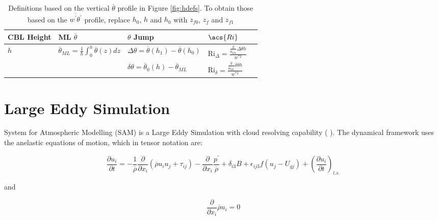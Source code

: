 \begin{table}[htbp]
\caption[Height definitions]{Definitions based on the vertical $\overline{\theta}$ profile in Figure \ref{fig:hdefs}.  To obtain those based on the $\overline{w^{'}\theta^{'}}$ profile, replace $h_{0}$, $h$ and $h_{0}$ with $z_{f0}$, $z_{f}$ and $z_{f1}$}
    \begin{center}
    \begin{tabular}{ p{1.2cm} p{3.3cm}  p{3.2cm}  p{3cm} p{2.5cm} }
      \acs{CBL} Height & \acs{ML} $\overline{\theta}$ & $\theta$ Jump &$\acs{Ri}$\\ \hline 
       $h$ & $\overline{\theta}_{ML} = \frac{1}{h}\int^{h}_{0}\overline{\theta}(z)dz$ & $\Delta \theta=\overline{\theta}(h_{1})-\overline{\theta}(h_{0})$ & \acs{Ri}$_{\Delta}=\frac{\frac{g}{\overline{\theta}_{ML}}\Delta \theta h}{w^{*2}}$  \\ [.3cm] %
        
       & &$\delta \theta = \overline{\theta}_{0}(h)- \overline{\theta}_{ML}$ & \acs{Ri}$_{\delta}=\frac{\frac{g}{\overline{\theta}_{ML}} \delta \theta h}{w^{*2}}$ \\ \hline
      \end{tabular}
\label{tab:reldefs}   
\end{center}    
\end{table}

\section{Large Eddy Simulation}
\label{sec:LargeEddieSimulation}

System for Atmospheric Modelling (SAM) is a Large Eddy Simulation with cloud resolving capability (\citeauthor{KhairRand} \citeyear{KhairRand}). The dynamical framework uses the anelastic equations of motion, which in tensor notation are:

\begin{equation}
\frac{\partial u_{i}}{\partial t} = -\frac{1}{\overline{\rho}}\frac{\partial}{\partial x_{i}}(\overline{\rho}u_{i}u_{j} + \tau_{ij}) - \frac{\partial}{\partial x_{i}}\frac{p^{'}}{\overline{\rho}} + \delta_{i3}B + \epsilon_{ij3}f(u_{j} - U_{gj}) + \left( \frac{\partial u_{i}}{\partial t} \right)_{l.s.}
\end{equation}

and

\begin{equation}
\frac{\partial}{\partial x_{i}}\overline{\rho}u_{i}=0
\end{equation}


